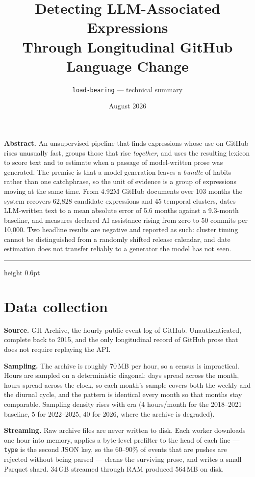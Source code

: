 \documentclass[11pt,a4paper]{article}
\title{\bfseries Detecting LLM-Associated Expressions\\Through Longitudinal GitHub Language Change}
\author{\normalsize \texttt{load-bearing} — technical summary}
\date{\normalsize August 2026}
\begin{document}
\maketitle
\thispagestyle{empty}

\noindent\textbf{Abstract.} An unsupervised pipeline that finds expressions whose
use on GitHub rises unusually fast, groups those that rise \emph{together}, and
uses the resulting lexicon to score text and to estimate when a passage of
model-written prose was generated. The premise is that a model generation leaves a
\emph{bundle} of habits rather than one catchphrase, so the unit of evidence is a
group of expressions moving at the same time. From 4.92M GitHub documents over 103
months the system recovers 62{,}828 candidate expressions and 45 temporal clusters,
dates LLM-written text to a mean absolute error of 5.6 months against a 9.3-month
baseline, and measures declared AI assistance rising from zero to 50 commits per
10{,}000. Two headline results are negative and reported as such: cluster timing
cannot be distinguished from a randomly shifted release calendar, and date
estimation does not transfer reliably to a generator the model has not seen.

\vspace{0.6em}
\hrule height 0.6pt
\vspace{0.9em}

\section{Data collection}

\textbf{Source.} GH Archive, the hourly public event log of GitHub. Unauthenticated,
complete back to 2015, and the only longitudinal record of GitHub prose that does
not require replaying the API.

\textbf{Sampling.} The archive is roughly 70\,MB per hour, so a census is
impractical. Hours are sampled on a deterministic diagonal: days spread across the
month, hours spread across the clock, so each month's sample covers both the weekly
and the diurnal cycle, and the pattern is identical every month so that months stay
comparable. Sampling density rises with era (4 hours/month for the 2018--2021
baseline, 5 for 2022--2025, 40 for 2026, where the archive is degraded).

\textbf{Streaming.} Raw archive files are never written to disk. Each worker
downloads one hour into memory, applies a byte-level prefilter to the head of each
line --- \texttt{type} is the second JSON key, so the 60--90\% of events that are
pushes are rejected without being parsed --- cleans the surviving prose, and writes a
small Parquet shard. 34\,GB streamed through RAM produced 564\,MB on disk.
\end{document}
